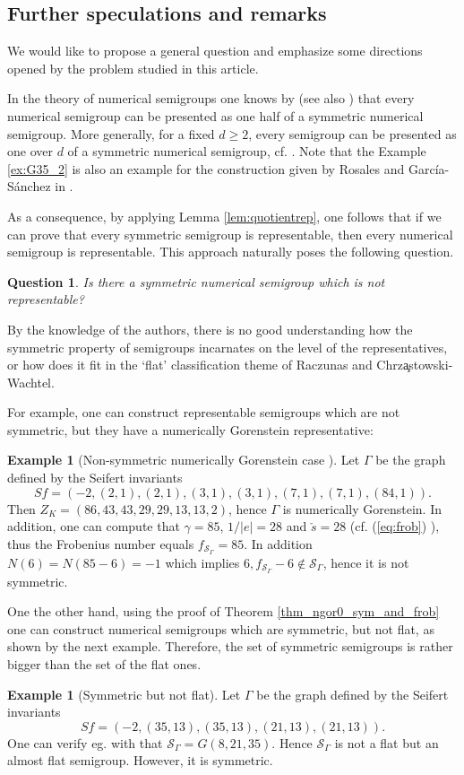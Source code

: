 \documentclass[oneside]{amsart}
\numberwithin{equation}{section}
\numberwithin{equation}{subsection}
\theoremstyle{plain}
\newtheorem{question}[equation]{Question}
\theoremstyle{definition}
\newtheorem{example}[equation]{Example}
\newcommand{\Se}{\mathcal{S}}
\newcommand{\G}{\Gamma}
\begin{document}
\subsection{Further speculations and remarks} \label{ss:specrem}

We would like to propose a general question and emphasize some directions opened by the problem studied in this article. 

In the theory of numerical semigroups one knows by \cite{symmhalf} (see also \cite{book_nsgp}) that every numerical semigroup 
can be presented as one half of  a symmetric numerical semigroup. More generally, for a fixed $d\geq 2$, every semigroup  can be presented as one over $d$ of a symmetric numerical semigroup, cf. \cite{symmquotient}.  Note that the Example \ref{ex:G35_2} is also an example for the construction given by Rosales and Garc\'ia-S\'anchez in \cite{symmhalf}. 

As a consequence, by applying Lemma \ref{lem:quotientrep}, one follows that if we can prove that every symmetric semigroup is representable, then 
every numerical semigroup is representable. This approach naturally poses the following question. 
\begin{question}
 Is there a symmetric numerical semigroup which is not representable?
\end{question}

By the knowledge of the authors, there is no good understanding how the symmetric property of semigroups incarnates on the level of the representatives, or how does it fit in the `flat' classification theme of Raczunas and Chrz\c astowski-Wachtel. 

For example, one can construct representable 
 semigroups which are not symmetric, but they have a numerically Gorenstein representative:
 \begin{example}[Non-symmetric numerically Gorenstein case \cite{stronglyflat}]
    Let $\G$ be the graph 
    defined by the Seifert invariants 
    $$Sf=(-2,(2,1),(2,1),(3,1),(3,1),(7,1),(7,1),(84,1)).$$
    Then  $Z_K=(86,43,43,29,29,13,13,2)$,
    hence $\G$ is numerically Gorenstein. In addition,
    one can compute that $\gamma=85$, $1/|e|=28$
    and $\check{s}=28$ (cf. (\ref{eq:frob}) ), thus the Frobenius number equals $f_{\Se_\G}=85$.
    In addition $N(6)=N(85-6)=-1$ which implies $6,f_{\Se_\G}-6\notin\Se_\G$,
    hence it is not symmetric.
\end{example}
 One the other hand, using the proof of Theorem \ref{thm_ngor0_sym_and_frob} one can construct numerical semigroups
 which  are symmetric, but not flat, as shown by the next example. Therefore, the set of symmetric semigroups is rather bigger than the set  of the flat ones. 
 \begin{example}[Symmetric but not flat]
    Let $\G$ be the graph defined by the Seifert invariants
    \[
     Sf=(-2,(35,13),(35,13),(21,13),(21,13)).   
    \]
    One can verify eg. with \cite{GAP4} that $\Se_\G=G(8,21,35)$. Hence
    $\Se_\G$ is not a flat but an almost flat semigroup. However, it is symmetric. 
 \end{example}   
 
\end{document}
